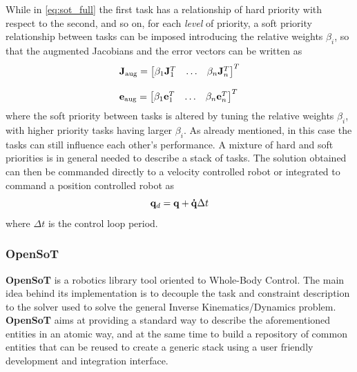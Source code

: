 While in \eqref{eq:sot_full} the first task has a relationship of hard priority with respect to the second, and so on, for each \emph{level} of priority, a soft priority relationship between tasks can be imposed introducing the relative weights $\beta_i$, so that the augmented Jacobians and the error vectors can be written as
\begin{equation}
\label{eq:augmented_jacobian}
\begin{array}{l}
\mathbf{J}_\text{aug}  =  \begin{bmatrix}
\beta_1\mathbf{J}_1^T & \dotsc& \beta_n\mathbf{J}_n^T\end{bmatrix}^T \\ 
\\
\mathbf{e}_\text{aug}  =  \begin{bmatrix}
\beta_1\mathbf{e}_1^T & \dotsc& \beta_n\mathbf{e}_n^T\end{bmatrix}^T 
\end{array}
\end{equation}
where the soft priority between tasks is altered by tuning the relative weights $\beta_i$, with higher priority tasks having larger $\beta_i$. As already mentioned, in this case the tasks can still influence each other's performance.
 A mixture of hard and soft priorities is in general needed to describe a stack of tasks.
 The solution obtained can then be commanded directly to a velocity controlled robot or integrated to command a position controlled robot as
\begin{equation}
    \mathbf{q}_d = \mathbf{q} + \mathbf{\dot{q}} \Delta t
\end{equation}
\todo{$\q+\dq$}
where $\Delta t$ is the control loop period.

\subsubsection{OpenSoT} \label{open_sot}
\textbf{OpenSoT} is a robotics library tool oriented to Whole-Body Control. The main idea behind its implementation is to decouple the task and constraint description to the solver used to solve the general Inverse Kinematics/Dynamics problem. \textbf{OpenSoT} aims at providing a standard way to describe the aforementioned entities in an atomic way, and at the same time to build a repository of common entities that can be reused to create a generic stack using a user friendly development and integration interface.

